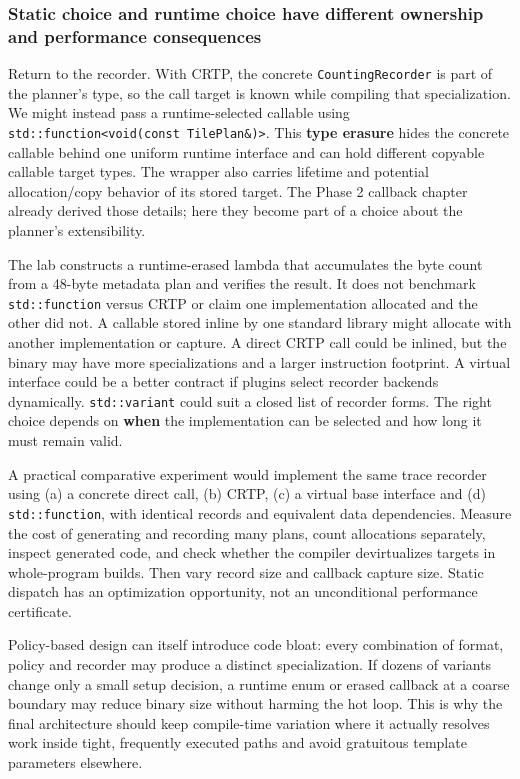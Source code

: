 \subsubsection{Static choice and runtime choice have different ownership and performance consequences}\label{static-choice-and-runtime-choice-have-different-ownership-and-performance-consequences}

Return to the recorder. With CRTP, the concrete \texttt{CountingRecorder} is part of the planner's type, so the call target is known while compiling that specialization. We might instead pass a runtime-selected callable using \texttt{std::function\textless{}void(const\ TilePlan\&)\textgreater{}}. This \textbf{type erasure} hides the concrete callable behind one uniform runtime interface and can hold different copyable callable target types. The wrapper also carries lifetime and potential allocation/copy behavior of its stored target. The Phase 2 callback chapter already derived those details; here they become part of a choice about the planner's extensibility.

The lab constructs a runtime-erased lambda that accumulates the byte count from a 48-byte metadata plan and verifies the result. It does not benchmark \texttt{std::function} versus CRTP or claim one implementation allocated and the other did not. A callable stored inline by one standard library might allocate with another implementation or capture. A direct CRTP call could be inlined, but the binary may have more specializations and a larger instruction footprint. A virtual interface could be a better contract if plugins select recorder backends dynamically. \texttt{std::variant} could suit a closed list of recorder forms. The right choice depends on \textbf{when} the implementation can be selected and how long it must remain valid.

A practical comparative experiment would implement the same trace recorder using (a) a concrete direct call, (b) CRTP, (c) a virtual base interface and (d) \texttt{std::function}, with identical records and equivalent data dependencies. Measure the cost of generating and recording many plans, count allocations separately, inspect generated code, and check whether the compiler devirtualizes targets in whole-program builds. Then vary record size and callback capture size. Static dispatch has an optimization opportunity, not an unconditional performance certificate.

Policy-based design can itself introduce code bloat: every combination of format, policy and recorder may produce a distinct specialization. If dozens of variants change only a small setup decision, a runtime enum or erased callback at a coarse boundary may reduce binary size without harming the hot loop. This is why the final architecture should keep compile-time variation where it actually resolves work inside tight, frequently executed paths and avoid gratuitous template parameters elsewhere.

